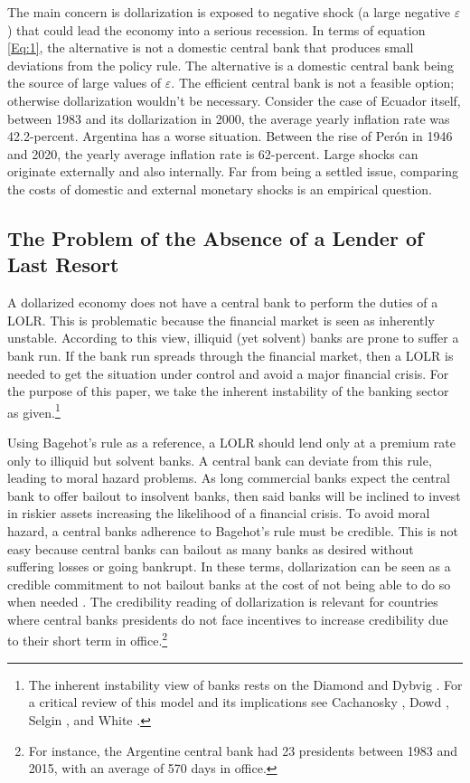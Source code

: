 \documentclass[12pt]{article}
\begin{document}
The main concern is dollarization is exposed to negative shock (a large negative $\varepsilon$) that could lead the economy into a serious recession. In terms of equation \ref{Eq:1}, the alternative is not a domestic central bank that produces small deviations from the policy rule. The alternative is a domestic central bank being the source of large values of $\varepsilon$. The efficient central bank is not a feasible option; otherwise dollarization wouldn't be necessary. Consider the case of Ecuador itself, between 1983 and its dollarization in 2000, the average yearly inflation rate was 42.2-percent. Argentina has a worse situation. Between the rise of Perón in 1946 and 2020, the yearly average inflation rate is 62-percent. Large shocks can originate externally and also internally. Far from being a settled issue, comparing the costs of domestic and external monetary shocks is an empirical question.

\subsection{The Problem of the Absence of a Lender of Last Resort}

A dollarized economy does not have a central bank to perform the duties of a LOLR. This is problematic because the financial market is seen as inherently unstable. According to this view, illiquid (yet solvent) banks are prone to suffer a bank run. If the bank run spreads through the financial market, then a LOLR is needed to get the situation under control and avoid a major financial crisis. For the purpose of this paper, we take the inherent instability of the banking sector as given.\footnote{The inherent instability view of banks rests on the Diamond and Dybvig \parencite*{Diamond1983}. For a critical review of this model and its implications see Cachanosky \parencite*[][Ch. 1]{Cachanosky2018a}, Dowd \parencite*{Dowd1992a}, Selgin \parencite*[][Ch. 11]{Selgin1996c}, and White \parencite*[][Ch. 6]{White1999c}.}

Using Bagehot's rule as a reference, a LOLR should lend only at a premium rate only to illiquid but solvent banks. A central bank can deviate from this rule, leading to moral hazard problems. As long commercial banks expect the central bank to offer bailout to insolvent banks, then said banks will be inclined to invest in riskier assets increasing the likelihood of a financial crisis. To avoid moral hazard, a central banks adherence to Bagehot's rule must be credible. This is not easy because central banks can bailout as many banks as desired without suffering losses or going bankrupt. In these terms, dollarization can be seen as a credible commitment to not bailout banks at the cost of not being able to do so when needed \parencite{Gale2002}. The credibility reading of dollarization is relevant for countries where central banks presidents do not face incentives to increase credibility due to their short term in office.\footnote{For instance, the Argentine central bank had 23 presidents between 1983 and 2015, with an average of 570 days in office.}
\end{document}
